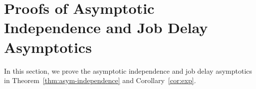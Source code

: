\documentclass[sigconf]{acmart}
\newcommand{\thistheoremname}{}
\newtheorem*{genericthm*}{\thistheoremname}
\newenvironment{namedthm*}[1]
{\renewcommand{\thistheoremname}{#1}%
\begin{genericthm*}}
{\end{genericthm*}}
\renewcommand{\Pr}{\mathbb{P}} %
\newcommand{\supn}{^{(n)}}
\begin{document}
\section{Proofs of Asymptotic Independence and Job Delay Asymptotics}\label{sec:proofs-asym-independence}

In this section, we prove the asymptotic independence and job delay asymptotics in Theorem~\ref{thm:asym-independence} and Corollary~\ref{cor:exp}.

\end{document}
